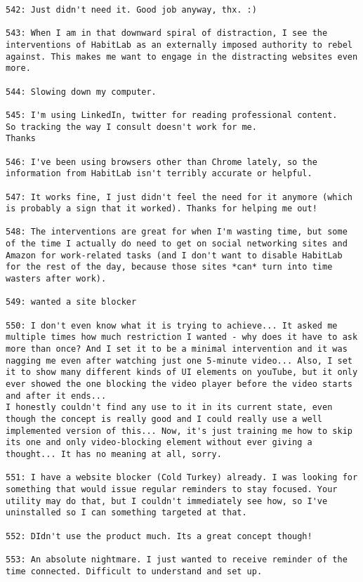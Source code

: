 \begin{lstlisting}[breaklines]
542: Just didn't need it. Good job anyway, thx. :)

543: When I am in that downward spiral of distraction, I see the interventions of HabitLab as an externally imposed authority to rebel against. This makes me want to engage in the distracting websites even more.

544: Slowing down my computer.

545: I'm using LinkedIn, twitter for reading professional content.
So tracking the way I consult doesn't work for me.
Thanks

546: I've been using browsers other than Chrome lately, so the information from HabitLab isn't terribly accurate or helpful.

547: It works fine, I just didn't feel the need for it anymore (which is probably a sign that it worked). Thanks for helping me out!

548: The interventions are great for when I'm wasting time, but some of the time I actually do need to get on social networking sites and Amazon for work-related tasks (and I don't want to disable HabitLab for the rest of the day, because those sites *can* turn into time wasters after work).

549: wanted a site blocker

550: I don't even know what it is trying to achieve... It asked me multiple times how much restriction I wanted - why does it have to ask more than once? And I set it to be a minimal intervention and it was nagging me even after watching just one 5-minute video... Also, I set it to show many different kinds of UI elements on youTube, but it only ever showed the one blocking the video player before the video starts and after it ends...
I honestly couldn't find any use to it in its current state, even though the concept is really good and I could really use a well implemented version of this... Now, it's just training me how to skip its one and only video-blocking element without ever giving a thought... It has no meaning at all, sorry.

551: I have a website blocker (Cold Turkey) already. I was looking for something that would issue regular reminders to stay focused. Your utility may do that, but I couldn't immediately see how, so I've uninstalled so I can something targeted at that.

552: DIdn't use the product much. Its a great concept though!

553: An absolute nightmare. I just wanted to receive reminder of the time connected. Difficult to understand and set up.


\end{lstlisting}
